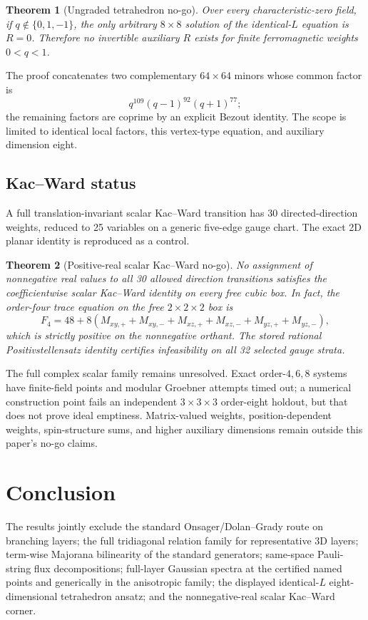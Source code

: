 \documentclass[11pt]{article}
\newtheorem{theorem}{Theorem}[section]
\begin{document}
\begin{theorem}[Ungraded tetrahedron no-go]
Over every characteristic-zero field, if $q\notin\{0,1,-1\}$, the only arbitrary $8\times8$ solution of the identical-$L$ equation is $R=0$. Therefore no invertible auxiliary $R$ exists for finite ferromagnetic weights $0<q<1$.
\end{theorem}

The proof concatenates two complementary $64\times64$ minors whose common factor is
\[
 q^{109}(q-1)^{92}(q+1)^{77};
\]
the remaining factors are coprime by an explicit Bezout identity. The scope is limited to identical local factors, this vertex-type equation, and auxiliary dimension eight.

\subsection{Kac--Ward status}
A full translation-invariant scalar Kac--Ward transition has 30 directed-direction weights, reduced to 25 variables on a generic five-edge gauge chart. The exact 2D planar identity is reproduced as a control.

\begin{theorem}[Positive-real scalar Kac--Ward no-go]
No assignment of nonnegative real values to all 30 allowed direction transitions satisfies the coefficientwise scalar Kac--Ward identity on every free cubic box. In fact, the order-four trace equation on the free $2\times2\times2$ box is
\[
 F_4=48+8(M_{xy,+}+M_{xy,-}+M_{xz,+}+M_{xz,-}+M_{yz,+}+M_{yz,-}),
\]
which is strictly positive on the nonnegative orthant. The stored rational Positivstellensatz identity certifies infeasibility on all 32 selected gauge strata.
\end{theorem}

The full complex scalar family remains unresolved. Exact order-$4,6,8$ systems have finite-field points and modular Groebner attempts timed out; a numerical construction point fails an independent $3\times3\times3$ order-eight holdout, but that does not prove ideal emptiness. Matrix-valued weights, position-dependent weights, spin-structure sums, and higher auxiliary dimensions remain outside this paper's no-go claims.

\section{Conclusion}
The results jointly exclude the standard Onsager/Dolan--Grady route on branching layers; the full tridiagonal relation family for representative 3D layers; term-wise Majorana bilinearity of the standard generators; same-space Pauli-string flux decompositions; full-layer Gaussian spectra at the certified named points and generically in the anisotropic family; the displayed identical-$L$ eight-dimensional tetrahedron ansatz; and the nonnegative-real scalar Kac--Ward corner.
\end{document}
